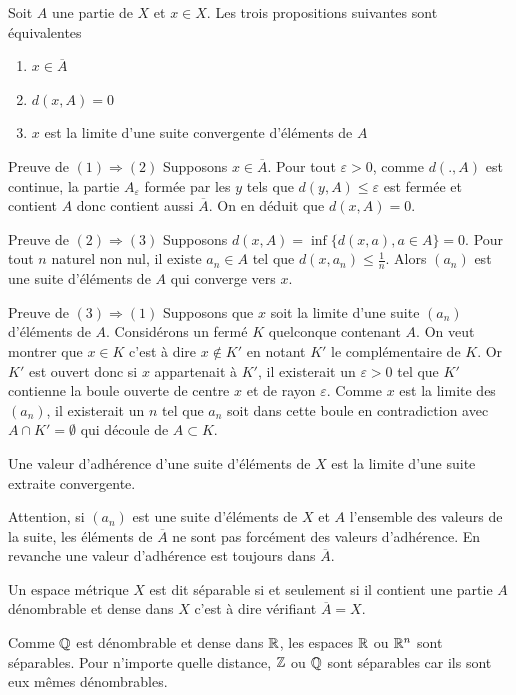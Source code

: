 \begin{propn} \label{prop:CaracAdher}
 Soit $A$ une partie de $X$ et $x\in X$. Les trois propositions suivantes sont équivalentes
 \begin{enumerate}
  \item $x \in \overline{A}$
  \item $d(x,A) = 0$
  \item $x$ est la limite d'une suite convergente d'éléments de $A$
 \end{enumerate}
\end{propn}
\begin{demo}
 Preuve de $(1)\Rightarrow (2)$\newline
Supposons $x\in \overline{A}$. Pour tout $\varepsilon >0$, comme $d( ., A)$ est continue, la partie $A_\varepsilon$ formée par les $y$ tels que $d(y,A) \leq \varepsilon$ est fermée et contient $A$ donc contient aussi $\overline{A}$. On en déduit que $d(x,A)=0$.

 Preuve de $(2)\Rightarrow (3)$\newline
Supposons $d(x,A) = \inf\{d(x,a), a\in A\}=0$. Pour tout $n$ naturel non nul, il existe $a_n \in A$ tel que $d(x,a_n)\leq \frac{1}{n}$. Alors $(a_n)$ est une suite d'éléments de $A$ qui converge vers $x$.

 Preuve de $(3)\Rightarrow (1)$\newline
Supposons que $x$ soit la limite d'une suite $(a_n)$ d'éléments de $A$. Considérons un fermé $K$ quelconque contenant $A$. On veut montrer que $x\in K$ c'est à dire $x\notin K'$ en notant  $K'$ le complémentaire de $K$. Or $K'$ est ouvert donc si $x$ appartenait à $K'$, il existerait un $\varepsilon >0$ tel que $K'$ contienne la boule ouverte de centre $x$ et de rayon $\varepsilon$. Comme $x$ est la limite des $(a_n)$, il existerait un $n$ tel que $a_n$ soit dans cette boule en contradiction avec $A \cap K' = \emptyset$ qui découle de $A\subset K$.
\end{demo}

\begin{defi}
 Une valeur d'adhérence d'une suite d'éléments de $X$ est la limite d'une suite extraite convergente.
\end{defi}
\noindent Attention, si $(a_n)$ est une suite d'éléments de $X$ et $A$ l'ensemble des valeurs de la suite, les éléments de $\overline{A}$ ne sont pas forcément des valeurs d'adhérence. En revanche une valeur d'adhérence est toujours dans $\overline{A}$.
\begin{defi}
 Un espace métrique $X$ est dit séparable si et seulement si il contient une partie $A$ dénombrable et dense dans $X$ c'est à dire vérifiant $\overline{A} = X$.
\end{defi}
\begin{exples}
 Comme $\mathbb{Q}$ est dénombrable et dense dans $\mathbb{R}$, les espaces $\mathbb{R}$ ou $\mathbb{R}^n$ sont séparables.\newline
 Pour n'importe quelle distance, $\mathbb{Z}$ ou $\mathbb{Q}$ sont séparables car ils sont eux mêmes dénombrables.
\end{exples}


